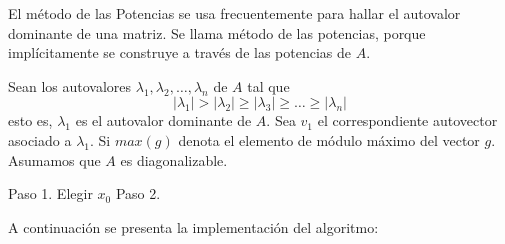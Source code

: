 El método de las Potencias se usa frecuentemente para hallar el autovalor dominante de una matriz. Se llama método de las potencias, porque implícitamente se construye a través de las potencias de $A$.

Sean los autovalores $\lambda_1, \lambda_2, \dots, \lambda_n$ de $A$ tal que
\[ |\lambda_1| > |\lambda_2| \geq |\lambda_3| \geq \dots \geq |\lambda_n| \]
esto es, $\lambda_1$ es el autovalor dominante de $A$. Sea $v_1$ el correspondiente autovector asociado a $\lambda_1$. Si $max(g)$ denota el elemento de módulo máximo del vector $g$. Asumamos que $A$ es diagonalizable.
\vspace{2mm}

\begin{algorithm}[H]
\caption{Método de las Potencias}
\DontPrintSemicolon
Paso 1. Elegir $x_0$\;
Paso 2. 
\end{algorithm}
A continuación se presenta la implementación del algoritmo:



